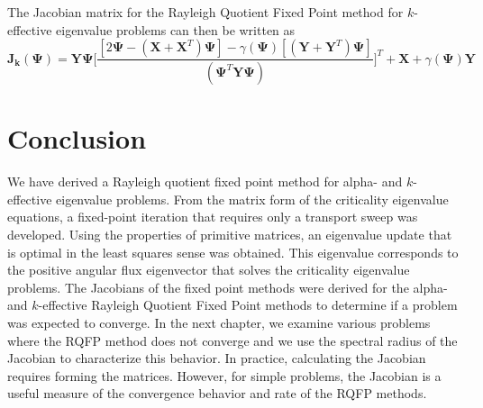 The Jacobian matrix for the Rayleigh Quotient Fixed Point method for $k$-effective eigenvalue problems can then be written as
\begin{equation}
	\mathbf{J_{k}}(\mathbf{\Psi}) = \mathbf{Y\Psi} \bigg [ \frac{[2 \mathbf{\Psi} - (\mathbf{X} + \mathbf{X}^{T}) \mathbf{\Psi}]  -\gamma(\mathbf{\Psi})[(\mathbf{Y} + \mathbf{Y}^{T})\mathbf{\Psi}]}{(\mathbf{\Psi}^{T} \mathbf{Y} \mathbf{\Psi})} \bigg] ^{T} + \mathbf{X} + \gamma(\mathbf{\Psi}) \mathbf{Y}
\end{equation}

\section{Conclusion}

We have derived a Rayleigh quotient fixed point method for alpha- and $k$-effective eigenvalue problems. From the matrix form of the criticality eigenvalue equations, a fixed-point iteration that requires only a transport sweep was developed. Using the properties of primitive matrices, an eigenvalue update that is optimal in the least squares sense was obtained. This eigenvalue corresponds to the positive angular flux eigenvector that solves the criticality eigenvalue problems. The Jacobians of the fixed point methods were derived for the alpha- and $k$-effective Rayleigh Quotient Fixed Point methods to determine if a problem was expected to converge. In the next chapter, we examine various problems where the RQFP method does not converge and we use the spectral radius of the Jacobian to characterize this behavior. In practice, calculating the Jacobian requires forming the matrices. However, for simple problems, the Jacobian is a useful measure of the convergence behavior and rate of the RQFP methods.